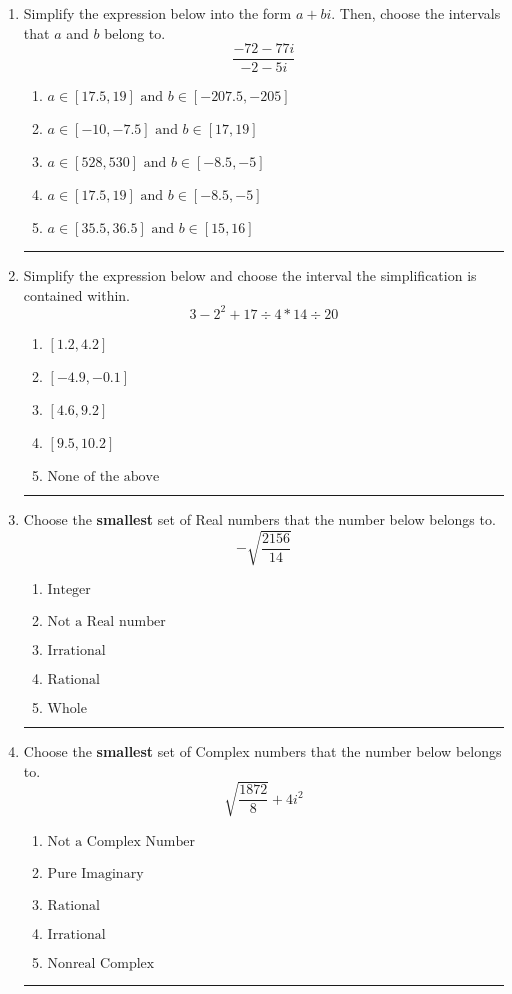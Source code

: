 \documentclass[14pt]{extbook}
\newcommand{\litem}[1]{\item#1\hspace*{-1cm}\rule{\textwidth}{0.4pt}}
\begin{document}
\begin{enumerate}
\litem{
Simplify the expression below into the form $a+bi$. Then, choose the intervals that $a$ and $b$ belong to.\[ \frac{-72 - 77 i}{-2 - 5 i} \]\begin{enumerate}[label=\Alph*.]
\item \( a \in [17.5, 19] \text{ and } b \in [-207.5, -205] \)
\item \( a \in [-10, -7.5] \text{ and } b \in [17, 19] \)
\item \( a \in [528, 530] \text{ and } b \in [-8.5, -5] \)
\item \( a \in [17.5, 19] \text{ and } b \in [-8.5, -5] \)
\item \( a \in [35.5, 36.5] \text{ and } b \in [15, 16] \)

\end{enumerate} }
\litem{
Simplify the expression below and choose the interval the simplification is contained within.\[ 3 - 2^2 + 17 \div 4 * 14 \div 20 \]\begin{enumerate}[label=\Alph*.]
\item \( [1.2, 4.2] \)
\item \( [-4.9, -0.1] \)
\item \( [4.6, 9.2] \)
\item \( [9.5, 10.2] \)
\item \( \text{None of the above} \)

\end{enumerate} }
\litem{
Choose the \textbf{smallest} set of Real numbers that the number below belongs to.\[ -\sqrt{\frac{2156}{14}} \]\begin{enumerate}[label=\Alph*.]
\item \( \text{Integer} \)
\item \( \text{Not a Real number} \)
\item \( \text{Irrational} \)
\item \( \text{Rational} \)
\item \( \text{Whole} \)

\end{enumerate} }
\litem{
Choose the \textbf{smallest} set of Complex numbers that the number below belongs to.\[ \sqrt{\frac{1872}{8}}+4i^2 \]\begin{enumerate}[label=\Alph*.]
\item \( \text{Not a Complex Number} \)
\item \( \text{Pure Imaginary} \)
\item \( \text{Rational} \)
\item \( \text{Irrational} \)
\item \( \text{Nonreal Complex} \)


\end{enumerate}}
\end{enumerate}
\end{document}
